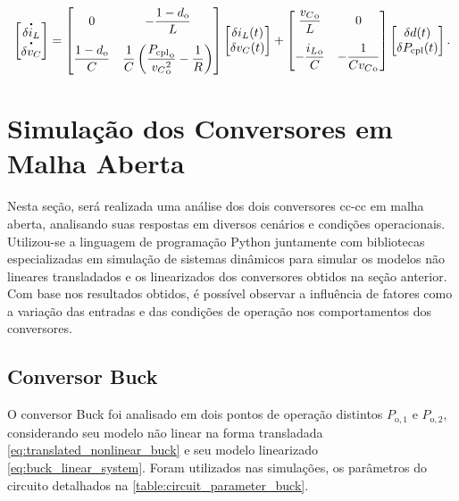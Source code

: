 \begin{equation}
  \begin{bmatrix} 
    \dt{\delta i_L} \\ \dt{\delta v_C} 
  \end{bmatrix} = 
  \begin{bmatrix} 
    \displaystyle 0 & \displaystyle -\frac{1 - d_{\mathrm{o}}}{L}  \\[12pt]\displaystyle \frac{1 - d_{\mathrm{o}}}{C} & \displaystyle \frac{1}{C}\left(\frac{{P_{\mathrm{cpl}}}_{\mathrm{o}}}{{{v_{C}}^2_{\mathrm{o}}}} - \frac{1}{R}\right) 
  \end{bmatrix} 
  \begin{bmatrix} 
    \delta i_L(t) \\ \delta v_C(t) 
  \end{bmatrix} + 
  \begin{bmatrix} 
    \displaystyle \frac{{v_C}_{\mathrm{o}}}{L} & 0 \\[12pt] 
    \displaystyle - \frac{{i_L}_{\mathrm{o}}}{C} & \displaystyle {-\frac{1}{C{v_C}_{\mathrm{o}}}} 
  \end{bmatrix}  
  \begin{bmatrix} 
    \delta d(t) \\ \delta P_{\mathrm{cpl}}(t) 
  \end{bmatrix}. \label{eq:boost_linear_system}
\end{equation}

\section{Simulação dos Conversores em Malha Aberta} \label{section:open_loop}

Nesta seção, será realizada uma análise dos dois conversores \acrshort{cc}-\acrshort{cc} em malha aberta, analisando suas respostas em diversos cenários e condições operacionais. Utilizou-se a linguagem de programação Python juntamente com bibliotecas especializadas em simulação de sistemas dinâmicos para simular os modelos não lineares transladados e os linearizados dos conversores obtidos na seção anterior. Com base nos resultados obtidos, é possível observar a influência de fatores como a variação das entradas e das condições de operação nos comportamentos dos conversores.

\subsection{Conversor Buck}

O conversor Buck foi analisado em dois pontos de operação distintos $P_{\mathrm{o}, 1}$ e $P_{\mathrm{o}, 2}$, considerando seu modelo não linear na forma transladada \eqref{eq:translated_nonlinear_buck} e seu modelo linearizado \eqref{eq:buck_linear_system}. Foram utilizados nas simulações, os parâmetros do circuito detalhados na \autoref{table:circuit_parameter_buck}.

